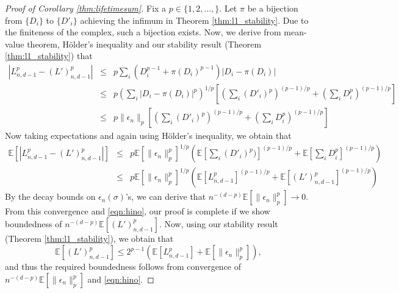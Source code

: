 \documentclass[12pt]{amsart}
\newcommand{\Exp}{\mathbb{E}}
\numberwithin{equation}{section}
\numberwithin{theorem}{section}
\newcommand{\1}{\mathbf{1}}
\begin{document}
\begin{proof}[Proof of Corollary \ref{thm:lifetimesum}]
Fix a $p \in \{1,2,\ldots,\}.$ Let $\pi$ be a bijection from $\{D_i\}$ to $\{D'_i\}$ achieving the infimum in Theorem \ref{thm:l1_stability}. Due to the finiteness of the complex, such a bijection exists. Now, we derive from mean-value theorem, H\"{o}lder's inequality and our stability result (Theorem \ref{thm:l1_stability})  that
%
\begin{eqnarray*}
|L^p_{n,d-1} - (L')^p_{n,d-1}| & \leq & p\sum_i (D_i^{p-1} + \pi(D_i)^{p-1})|D_i - \pi(D_i)|  \\
& \leq &  p(\sum_i|D_i - \pi(D_i)|^p)^{1/p}\left[(\sum_i (D'_i)^p)^{(p-1)/p} + (\sum_i D_i^p)^{(p-1)/p}\right] \\
& \leq & p \|\epsilon_n\|_p \left[(\sum_i (D'_i)^p)^{(p-1)/p} + (\sum_i D_i^p)^{(p-1)/p}\right]
\end{eqnarray*}
%
Now taking expectations and again using H\"{o}lder's inequality, we obtain that
%
\begin{eqnarray}
\Exp[|L^p_{n,d-1} - (L')^p_{n,d-1}|] & \leq & p \Exp[\|\epsilon_n\|^p_p]^{1/p} \left( \Exp[\sum_i (D'_i)^p)]^{(p-1)/p} + \Exp[\sum_i D_i^p]^{(p-1)/p}\right) \nonumber  \\
& \leq  & p \Exp[\|\epsilon_n\|^p_p]^{1/p} \left( \Exp[L^p_{n,d-1}]^{(p-1)/p} +  \Exp[(L')^p_{n,d-1}]^{(p-1)/p}  \right) \label{eqn:lifetime_bd1}
\end{eqnarray}
%
By the decay bounds on $\epsilon_n(\sigma)$'s, we can derive that $n^{-(d-p)}\Exp[\|\epsilon_n\|^p_p] \to 0$. From this convergence and \eqref{eqn:hino}, our proof is complete if
we show boundedness of $n^{-(d-p)} \Exp[(L')^p_{n,d-1}]$.  Now, using our stability result (Theorem \ref{thm:l1_stability}), we obtain that
%
\[ \Exp[(L')^p_{n,d-1}] \leq 2^{p-1} \left( \Exp[L^p_{n,d-1}]  +  \Exp[\|\epsilon_n\|^p_p] \right),\]
%
and thus the required boundedness follows from convergence of  $n^{-(d-p)}\Exp[\|\epsilon_n\|^p_p]$ and \eqref{eqn:hino}.	
\end{proof}
\end{document}
